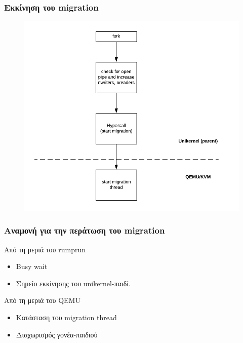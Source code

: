 \documentclass[red,slidestop,notes,compress,mathserif]{beamer}
\begin{document}
\begin{frame}
\frametitle{Εκκίνηση του migration}
\begin{figure}
\center
\includegraphics[scale=0.57]{figures/fork_stage1.png}
\end{figure}
\end{frame}

\begin{frame}
\frametitle{Αναμονή για την περάτωση του migration}
\begin{block}{Από τη μεριά του rumprun}
\begin{itemize}
\item Busy wait 
\item Σημείο εκκίνησης του unikernel-παιδί.
\end{itemize}
\end{block}
\begin{block}{Από τη μεριά του QEMU}
\begin{itemize}
\item Κατάσταση του migration thread
\item Διαχωρισμός γονέα-παιδιού
\end{itemize}
\end{block}
\end{frame}

\end{document}
